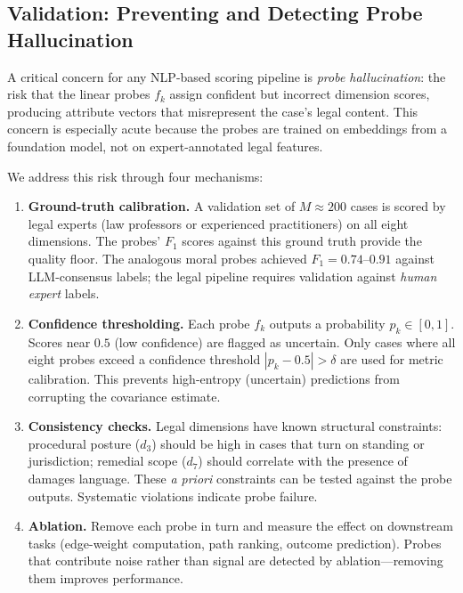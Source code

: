 \documentclass[12pt]{article}
\theoremstyle{definition}
\theoremstyle{remark}
\begin{document}
\subsection{Validation: Preventing and Detecting Probe Hallucination}
\label{sec:validation}

A critical concern for any NLP-based scoring pipeline is \emph{probe hallucination}: the risk that the linear probes $f_k$ assign confident but incorrect dimension scores, producing attribute vectors that misrepresent the case's legal content.  This concern is especially acute because the probes are trained on embeddings from a foundation model, not on expert-annotated legal features.

We address this risk through four mechanisms:

\begin{enumerate}
    \item \textbf{Ground-truth calibration.}  A validation set of $M \approx 200$ cases is scored by legal experts (law professors or experienced practitioners) on all eight dimensions.  The probes' $F_1$ scores against this ground truth provide the quality floor.  The analogous moral probes achieved $F_1 = 0.74$--$0.91$ against LLM-consensus labels; the legal pipeline requires validation against \emph{human expert} labels.

    \item \textbf{Confidence thresholding.}  Each probe $f_k$ outputs a probability $p_k \in [0,1]$.  Scores near $0.5$ (low confidence) are flagged as uncertain.  Only cases where all eight probes exceed a confidence threshold $|p_k - 0.5| > \delta$ are used for metric calibration.  This prevents high-entropy (uncertain) predictions from corrupting the covariance estimate.

    \item \textbf{Consistency checks.}  Legal dimensions have known structural constraints: procedural posture ($d_3$) should be high in cases that turn on standing or jurisdiction; remedial scope ($d_7$) should correlate with the presence of damages language.  These \emph{a priori} constraints can be tested against the probe outputs.  Systematic violations indicate probe failure.

    \item \textbf{Ablation.}  Remove each probe in turn and measure the effect on downstream tasks (edge-weight computation, path ranking, outcome prediction).  Probes that contribute noise rather than signal are detected by ablation---removing them improves performance.
\end{enumerate}
\end{document}

